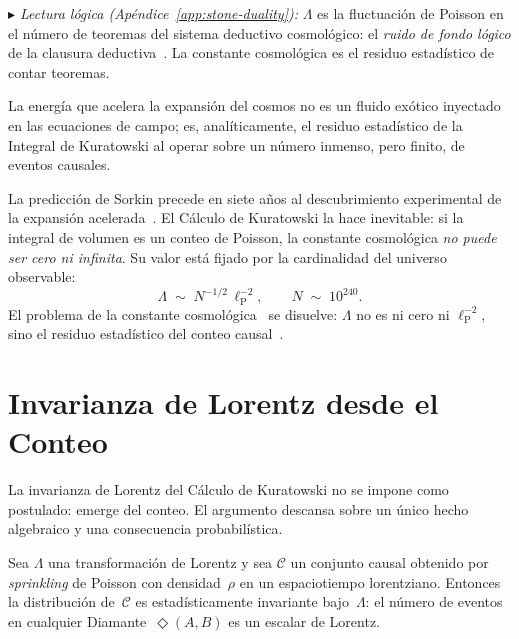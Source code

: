 \documentclass[11pt, a4paper, openany]{book}
\newcommand{\lP}{\ell_{\mathrm{P}}}
\newcommand{\diam}[2]{\Diamond(#1,#2)}
\newcommand{\stoneref}[1]{%
  \smallskip\noindent
  {\small\color{structure!70}\textit{$\blacktriangleright$ Lectura
  l\'ogica (Ap\'endice~\ref{app:stone-duality}):} #1}%
  \smallskip}
\begin{document}
\stoneref{$\Lambda$ es la fluctuaci\'on de Poisson en el n\'umero de
teoremas del sistema deductivo cosmol\'ogico: el \emph{ruido de fondo
l\'ogico} de la clausura deductiva~\cite{tarski1930}. La constante
cosmol\'ogica es el residuo estad\'istico de contar teoremas.}

\noindent
La energ\'ia que acelera la expansi\'on del cosmos no es un fluido
ex\'otico inyectado en las ecuaciones de campo; es, anal\'iticamente,
el residuo estad\'istico de la Integral de Kuratowski al operar sobre
un n\'umero inmenso, pero finito, de eventos causales.

\begin{result}[title={La Constante Cosmol\'ogica como Ruido de Conteo}]
\label{res:cosmological-constant}
La predicci\'on de Sorkin precede en siete a\~nos al descubrimiento
experimental de la expansi\'on
acelerada~\cite{perlmutter1999,riess1998}.
El C\'alculo de Kuratowski la hace inevitable: si la integral de
volumen es un conteo de Poisson, la constante cosmol\'ogica \emph{no
puede ser cero ni infinita}. Su valor est\'a fijado por la
cardinalidad del universo observable:
\[
  \Lambda \;\sim\; N^{-1/2}\,\lP^{-2},
  \qquad
  N \;\sim\; 10^{240}.
\]
El problema de la constante cosmol\'ogica~\cite{weinberg1989} se
disuelve: $\Lambda$ no es ni cero ni $\lP^{-2}$, sino el residuo
estad\'istico del conteo
causal~\cite{sorkin2005lambda,zwane2018}.
\end{result}

\section{Invarianza de Lorentz desde el Conteo}

La invarianza de Lorentz del C\'alculo de Kuratowski no se impone
como postulado: emerge del conteo. El argumento descansa sobre un
\'unico hecho algebraico y una consecuencia probabil\'istica.

\begin{theorem}
\label{thm:lorentz-sprinkling}
Sea $\Lambda$ una transformaci\'on de Lorentz y sea $\mathcal{C}$ un
conjunto causal obtenido por \emph{sprinkling} de Poisson con
densidad~$\rho$ en un espaciotiempo lorentziano. Entonces la
distribuci\'on de~$\mathcal{C}$ es estad\'isticamente invariante
bajo~$\Lambda$: el n\'umero de eventos en cualquier
Diamante~$\diam{A}{B}$ es un escalar de Lorentz.
\end{theorem}
\end{document}

